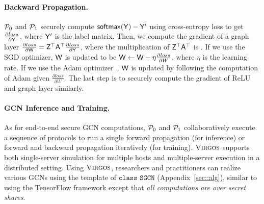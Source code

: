 \paragraph{Backward Propagation.}
$\mathcal{P}_0$ and $\mathcal{P}_1$ securely compute $\mathsf{softmax} (\mathsf{Y})-\mathsf{Y}'$ using cross-entropy loss to get $\frac{\partial loss}{\partial \mathsf{Y}}$, where $\mathsf{Y}'$ is the label matrix.
Then, we compute the gradient of a graph layer $\frac{\partial loss}{\partial \mathsf{W}}=\mathsf{Z}^{\top}\mathsf{A}^{\top} \frac{\partial loss}{\partial \mathsf{Y}}$, where the multiplication of $\mathsf{Z}^{\top}\mathsf{A}^{\top}$ is \osmm.
If we use the SGD optimizer, $\mathsf{W}$ is updated to be $\mathsf{W} \leftarrow \mathsf{W} - \eta \frac{\partial loss}{\partial W}$,
where $\eta$ is the learning rate.
If we use the Adam optimizer~\cite{iclr/KingmaB14}, $\mathsf{W}$ is updated by following the computation of Adam given $\frac{\partial loss}{\partial W}$.
The last step is to securely compute the gradient of ReLU and graph layer similarly.

\paragraph{GCN Inference and Training.} 
As for end-to-end secure GCN computations, $\mathcal{P}_0$ and $\mathcal{P}_1$ collaboratively execute a sequence of protocols to run a single forward propagation (for inference) or forward and backward propagation iteratively (for training).
$\textnormal{\textsc{Virgos}}$ supports both single-server simulation for multiple hosts and multiple-server execution in a distributed setting.
Using $\textnormal{\textsc{Virgos}}$, researchers and practitioners can realize various GCNs
using the template of $\texttt{class SGCN}$ (Appendix~\ref{sec::alg}),
similar to using the TensorFlow framework except that \emph{all computations are over secret shares}.